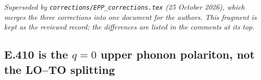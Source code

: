 \noindent\textit{Superseded by \texttt{corrections/EPP\_corrections.tex} (25 October 2026), which merges the three corrections into one document for the authors. This fragment is kept as the reviewed record; the differences are listed in the comments at its top.}\par


\subsection*{E.410 is the $q=0$ upper phonon polariton, not the LO--TO splitting}

